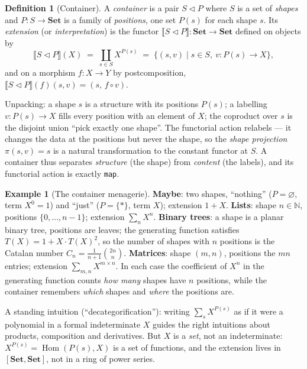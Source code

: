 \documentclass[11pt,a4paper]{book}
\newcommand{\Set}{\mathbf{Set}}
\newcommand{\cont}[2]{#1 \triangleleft #2}
\newcommand{\Ext}[1]{\llbracket #1 \rrbracket}
\DeclareMathOperator{\Hom}{Hom}
\theoremstyle{plain}
\theoremstyle{definition}
\newtheorem{Definition}[Theorem]{Definition}
\newtheorem{Example}[Theorem]{Example}
\theoremstyle{remark}
\begin{document}
\begin{Definition}[Container]\label{def:container}
A \emph{container} is a pair $\cont SP$ where $S$ is a set of \emph{shapes} and
$P\colon S\to\Set$ is a family of \emph{positions}, one set $P(s)$ for each shape
$s$. Its \emph{extension} (or \emph{interpretation}) is the functor
$\Ext{\cont SP}\colon\Set\to\Set$ defined on objects by
\[
  \Ext{\cont SP}(X) \;=\; \coprod_{s\in S} X^{P(s)}
    \;=\; \bigl\{ (s,v) \mid s\in S,\ v\colon P(s)\to X \bigr\},
\]
and on a morphism $f\colon X\to Y$ by postcomposition,
$\Ext{\cont SP}(f)(s,v) = (s,\, f\circ v)$.
\end{Definition}

Unpacking: a shape $s$ is a structure with its positions $P(s)$; a labelling
$v\colon P(s)\to X$ fills every position with an element of $X$; the coproduct
over $s$ is the disjoint union ``pick exactly one shape''. The functorial action
relabels --- it changes the data at the positions but never the shape, so the
\emph{shape projection} $\pi(s,v)=s$ is a natural transformation to the constant
functor at $S$. A container thus separates \emph{structure} (the shape) from
\emph{content} (the labels), and its functorial action is exactly \texttt{map}.

\begin{Example}[The container menagerie]\label{ex:menagerie}
\textbf{Maybe}: two shapes, ``nothing'' ($P=\varnothing$, term $X^0=1$) and
``just'' ($P=\{*\}$, term $X$); extension $1+X$.
\textbf{Lists}: shape $n\in\mathbb N$, positions $\{0,\dots,n-1\}$; extension
$\sum_{n} X^n$.
\textbf{Binary trees}: a shape is a planar binary tree, positions are leaves;
the generating function satisfies $T(X)=1+X\cdot T(X)^2$, so the number of shapes
with $n$ positions is the Catalan number $C_n=\frac1{n+1}\binom{2n}{n}$.
\textbf{Matrices}: shape $(m,n)$, positions the $mn$ entries; extension
$\sum_{m,n} X^{m\times n}$. In each case the coefficient of $X^n$ in the
generating function counts \emph{how many} shapes have $n$ positions, while the
container remembers \emph{which} shapes and \emph{where} the positions are.
\end{Example}

A standing intuition (``decategorification''): writing $\sum_s X^{P(s)}$ as if it
were a polynomial in a formal indeterminate $X$ guides the right intuitions about
products, composition and derivatives. But $X$ is a \emph{set}, not an
indeterminate: $X^{P(s)}=\Hom(P(s),X)$ is a set of functions, and the extension
lives in $[\Set,\Set]$, not in a ring of power series.
\end{document}
